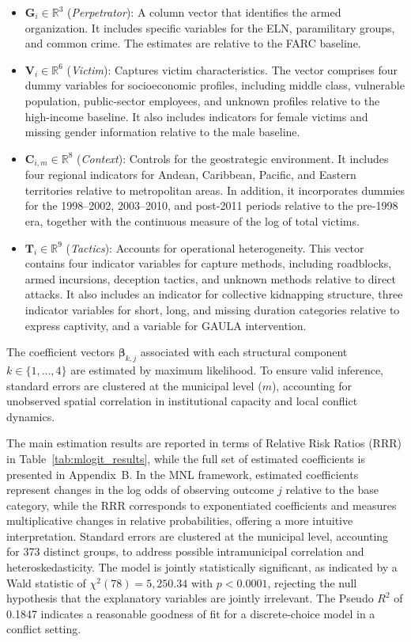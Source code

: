 \documentclass[12pt,a4paper]{article}
\theoremstyle{plain}
\theoremstyle{definition}
\theoremstyle{remark}
\newcommand{\1}{\mathbf{1}}
\begin{document}
\begin{itemize}
    \item $\mathbf{G}_i \in \mathbb{R}^3$ (\textit{Perpetrator}): A column vector that identifies the armed organization. It includes specific variables for the ELN, paramilitary groups, and common crime. The estimates are relative to the FARC baseline.
    \item $\mathbf{V}_i \in \mathbb{R}^6$ (\textit{Victim}): Captures victim characteristics. The vector comprises four dummy variables for socioeconomic profiles, including middle class, vulnerable population, public-sector employees, and unknown profiles relative to the high-income baseline. It also includes indicators for female victims and missing gender information relative to the male baseline.
    \item $\mathbf{C}_{i,m} \in \mathbb{R}^8$ (\textit{Context}): Controls for the geostrategic environment. It includes four regional indicators for Andean, Caribbean, Pacific, and Eastern territories relative to metropolitan areas. In addition, it incorporates dummies for the 1998--2002, 2003--2010, and post-2011 periods relative to the pre-1998 era, together with the continuous measure of the log of total victims.
    \item $\mathbf{T}_i \in \mathbb{R}^9$ (\textit{Tactics}): Accounts for operational heterogeneity. This vector contains four indicator variables for capture methods, including roadblocks, armed incursions, deception tactics, and unknown methods relative to direct attacks. It also includes an indicator for collective kidnapping structure, three indicator variables for short, long, and missing duration categories relative to express captivity, and a variable for GAULA intervention.
\end{itemize}

The coefficient vectors $\boldsymbol{\beta}_{k,j}$ associated with each structural component $k \in \{1, \dots, 4\}$ are estimated by maximum likelihood. To ensure valid inference, standard errors are clustered at the municipal level ($m$), accounting for unobserved spatial correlation in institutional capacity and local conflict dynamics.

The main estimation results are reported in terms of Relative Risk Ratios (RRR) in Table~\ref{tab:mlogit_results}, while the full set of estimated coefficients is presented in Appendix~B. In the MNL framework, estimated coefficients represent changes in the log odds of observing outcome \(j\) relative to the base category, while the RRR corresponds to exponentiated coefficients and measures multiplicative changes in relative probabilities, offering a more intuitive interpretation. Standard errors are clustered at the municipal level, accounting for 373 distinct groups, to address possible intramunicipal correlation and heteroskedasticity. The model is jointly statistically significant, as indicated by a Wald statistic of \(\chi^2(78)=5{,}250.34\) with \(p<0.0001\), rejecting the null hypothesis that the explanatory variables are jointly irrelevant. The Pseudo \(R^2\) of 0.1847 indicates a reasonable goodness of fit for a discrete-choice model in a conflict setting.
\end{document}
